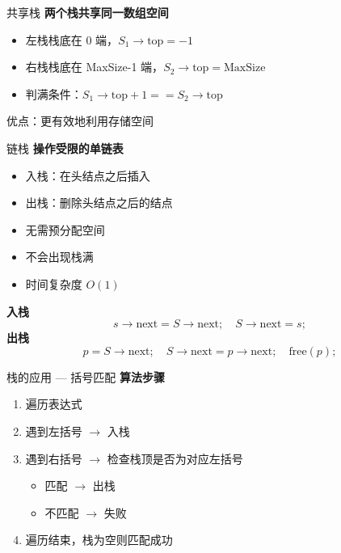 \documentclass[10pt, aspectratio=169]{beamer}
\begin{document}
\begin{frame}{共享栈}
    \textbf{两个栈共享同一数组空间}
    \vspace{0.5em}
    \begin{itemize}
        \item 左栈栈底在 0 端，$S_1 \to \text{top} = -1$
        \item 右栈栈底在 MaxSize-1 端，$S_2 \to \text{top} = \text{MaxSize}$
        \item 判满条件：$S_1 \to \text{top} + 1 == S_2 \to \text{top}$
    \end{itemize}
    \vspace{0.5em}
    优点：更有效地利用存储空间
\end{frame}

\begin{frame}{链栈}
    \textbf{操作受限的单链表}
    \vspace{0.5em}
    \begin{itemize}
        \item 入栈：在头结点之后插入
        \item 出栈：删除头结点之后的结点
        \item 无需预分配空间
        \item 不会出现栈满
        \item 时间复杂度 $O(1)$
    \end{itemize}
    \vspace{0.5em}
    \textbf{入栈}
    \[
    s \to \text{next} = S \to \text{next};\quad S \to \text{next} = s;
    \]
    \textbf{出栈}
    \[
    p = S \to \text{next};\quad S \to \text{next} = p \to \text{next};\quad \text{free}(p);
    \]
\end{frame}

\begin{frame}{栈的应用 --- 括号匹配}
    \textbf{算法步骤}
    \begin{enumerate}
        \item 遍历表达式
        \item 遇到左括号 $\to$ 入栈
        \item 遇到右括号 $\to$ 检查栈顶是否为对应左括号
        \begin{itemize}
            \item 匹配 $\to$ 出栈
            \item 不匹配 $\to$ 失败
        \end{itemize}
        \item 遍历结束，栈为空则匹配成功
    \end{enumerate}
\end{frame}
\end{document}
